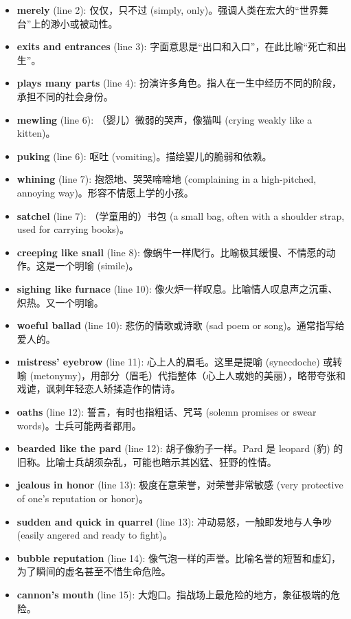 \documentclass[12pt, a4paper]{article}
\begin{document}
\begin{itemize}
    \item \textbf{merely} (line 2): 仅仅，只不过 (simply, only)。强调人类在宏大的“世界舞台”上的渺小或被动性。
    \item \textbf{exits and entrances} (line 3): 字面意思是“出口和入口”，在此比喻“死亡和出生”。
    \item \textbf{plays many parts} (line 4): 扮演许多角色。指人在一生中经历不同的阶段，承担不同的社会身份。
    \item \textbf{mewling} (line 6): （婴儿）微弱的哭声，像猫叫 (crying weakly like a kitten)。
    \item \textbf{puking} (line 6): 呕吐 (vomiting)。描绘婴儿的脆弱和依赖。
    \item \textbf{whining} (line 7): 抱怨地、哭哭啼啼地 (complaining in a high-pitched, annoying way)。形容不情愿上学的小孩。
    \item \textbf{satchel} (line 7): （学童用的）书包 (a small bag, often with a shoulder strap, used for carrying books)。
    \item \textbf{creeping like snail} (line 8): 像蜗牛一样爬行。比喻极其缓慢、不情愿的动作。这是一个明喻 (simile)。
    \item \textbf{sighing like furnace} (line 10): 像火炉一样叹息。比喻情人叹息声之沉重、炽热。又一个明喻。
    \item \textbf{woeful ballad} (line 10): 悲伤的情歌或诗歌 (sad poem or song)。通常指写给爱人的。
    \item \textbf{mistress' eyebrow} (line 11): 心上人的眉毛。这里是提喻 (synecdoche) 或转喻 (metonymy)，用部分（眉毛）代指整体（心上人或她的美丽），略带夸张和戏谑，讽刺年轻恋人矫揉造作的情诗。
    \item \textbf{oaths} (line 12): 誓言，有时也指粗话、咒骂 (solemn promises or swear words)。士兵可能两者都用。
    \item \textbf{bearded like the pard} (line 12): 胡子像豹子一样。Pard 是 leopard (豹) 的旧称。比喻士兵胡须杂乱，可能也暗示其凶猛、狂野的性情。
    \item \textbf{jealous in honor} (line 13): 极度在意荣誉，对荣誉非常敏感 (very protective of one's reputation or honor)。
    \item \textbf{sudden and quick in quarrel} (line 13): 冲动易怒，一触即发地与人争吵 (easily angered and ready to fight)。
    \item \textbf{bubble reputation} (line 14): 像气泡一样的声誉。比喻名誉的短暂和虚幻，为了瞬间的虚名甚至不惜生命危险。
    \item \textbf{cannon's mouth} (line 15): 大炮口。指战场上最危险的地方，象征极端的危险。

\end{itemize}
\end{document}
